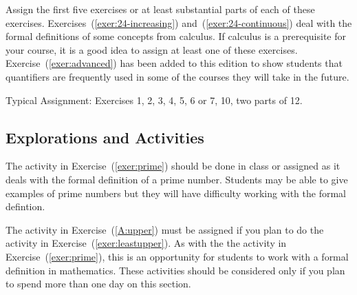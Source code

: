 Assign the first five exercises or at least substantial parts of each of these exercises.  Exercises~(\ref{exer:24-increasing}) and~(\ref{exer:24-continuous}) deal with the formal definitions of some concepts from calculus.  If calculus is a prerequisite for your course, it is a good idea to assign at least one of these exercises.  
Exercise~(\ref{exer:advanced}) has been added to this edition to show students that quantifiers are frequently used in some of the courses they will take in the future.

\vskip6pt
\noindent
Typical Assignment:  Exercises 1, 2, 3, 4, 5, 6 or 7, 10, two parts of 12.
\hbreak


\subsection*{Explorations and Activities}
The activity in Exercise~(\ref{exer:prime}) should be done in class or assigned as it deals with the formal definition of a prime number.  Students may be able to give examples of prime numbers but they will have difficulty working with the formal defintion.

\newpar
The activity in Exercise~(\ref{A:upper}) must be assigned if you plan to do the activity in  Exercise~(\ref{exer:leastupper}).  As with the the activity in Exercise~(\ref{exer:prime}), this is an opportunity for students to work with a formal definition in mathematics.  These activities should be considered only if you plan to spend more than one day on this section.
\hbreak

\endinput
